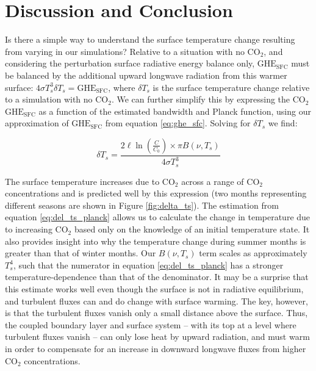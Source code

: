 \documentclass[draft]{agujournal2019}
\begin{document}
\section{Discussion and Conclusion}\label{section:discussion} 
%

Is there a simple way to understand the surface temperature change resulting from varying  in our simulations? Relative to a situation with no CO$_2$, and considering the perturbation surface radiative energy balance only, $\text{GHE}_\text{{SFC}}$ must be balanced by the additional upward longwave radiation from this warmer surface: $ 4 \sigma T_s^3 \delta T_s = \text{GHE}_{\text{SFC}}$, where $\delta T_s$ is the surface temperature change relative to a simulation with no CO$_2$. We can further simplify this by expressing the CO$_2$ $\text{GHE}_\text{{SFC}}$ as a function of the estimated bandwidth and Planck function, using our approximation of $\text{GHE}_\text{{SFC}}$ from equation \ref{eq:ghe_sfc}. Solving for $\delta T_s$ we find:

\begin{equation}\label{eq:del_ts_planck}
    \delta T_s = \frac{2\ell \ln(\frac{C}{C_0}) \times \pi B(\nu, T_s)}{4\sigma T_s^3}
\end{equation}

The surface temperature increases due to CO$_2$ across a range of CO$_2$ concentrations and is predicted well by this expression (two months representing different seasons are shown in Figure \ref{fig:delta_ts}). The estimation from equation \ref{eq:del_ts_planck} allows us to calculate the change in temperature due to increasing CO$_2$ based only on the knowledge of an initial temperature state. It also provides insight into why the temperature change during summer months is greater than that of winter months. Our $B(\nu, T_s)$ term scales as approximately $T_s^4$, such that the numerator in equation \ref{eq:del_ts_planck} has a stronger temperature-dependence than that of the denominator. It may be a surprise that this estimate works well even though the surface is not in radiative equilibrium, and turbulent fluxes can and do change with surface warming. The key, however, is that the turbulent fluxes vanish only a small distance above the surface. Thus, the coupled boundary layer and surface system -- with its top at a level where turbulent fluxes vanish -- can only lose heat by upward radiation, and must warm in order to compensate for an increase in downward longwave fluxes from higher CO$_2$ concentrations.  
\end{document}
